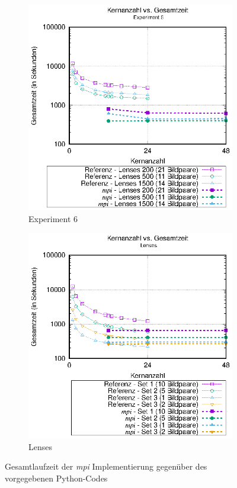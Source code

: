 \begin{center}
	\begin{figure}[htbp]
		\begin{subfigure}[b]{0.45\textwidth}
			\centering
			\includegraphics[width=\textwidth]{pdf/mpi_times_exp6}
			\caption{Experiment 6}
			\label{fig:mpi_times_exp6}
		\end{subfigure}
		\hfill
		\begin{subfigure}[b]{0.45\textwidth}
			\centering
			\includegraphics[width=\textwidth]{pdf/mpi_times_lenses}
			\caption{Lenses}
			\label{fig:mpi_times_lenses}
		\end{subfigure}
		\caption{Gesamtlaufzeit der \textit{mpi} Implementierung gegenüber des vorgegebenen Python-Codes}
		\label{fig:mpi_times}
	\end{figure}
\end{center}

